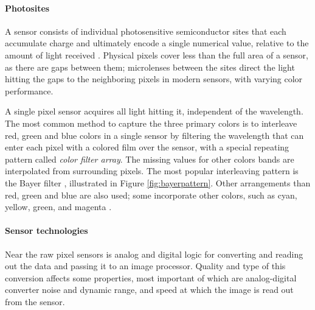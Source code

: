 \paragraph{Photosites}
A sensor consists of individual photosensitive semiconductor sites that each accumulate charge and ultimately encode a single numerical value, relative to the amount of light received \cite{nakamura2005image}.
Physical pixels cover less than the full area of a sensor, as there are gaps between them;
microlenses between the sites direct the light hitting the gaps to the neighboring pixels in modern sensors, with varying color performance. \cite{el2005cmos}

A single pixel sensor acquires all light hitting it, independent of the wavelength.
The most common method to capture the three primary colors is to interleave red, green and blue colors in a single sensor by filtering the wavelength that can enter each pixel with a colored film over the sensor, with a special repeating pattern called \emph{color filter array}.
The missing values for other colors bands are interpolated from surrounding pixels.
The most popular interleaving pattern is the Bayer filter \cite{szeliski10vision}, illustrated in Figure \ref{fig:bayerpattern}.
Other arrangements than red, green and blue are also used; some incorporate other colors, such as cyan, yellow, green, and magenta \cite{park2003implementing}.



\paragraph{Sensor technologies}
Near the raw pixel sensors is analog and digital logic for converting and reading out the data and passing it to an image processor.
Quality and type of this conversion affects some properties, most important of which are analog-digital converter noise and dynamic range, and speed at which the image is read out from the sensor.

